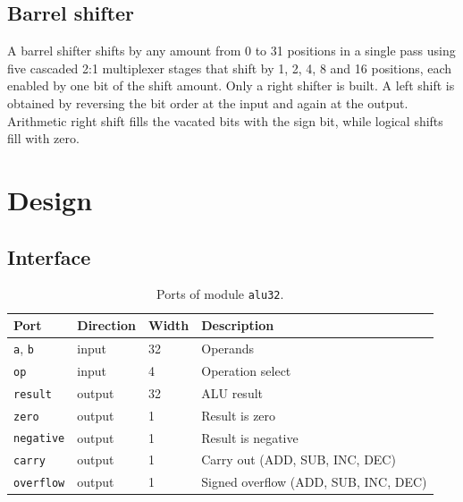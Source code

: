 \documentclass[11pt,a4paper]{article}
\begin{document}
\subsection{Barrel shifter}
A barrel shifter shifts by any amount from 0 to 31 positions in a single pass using five cascaded 2:1 multiplexer stages that shift by 1, 2, 4, 8 and 16 positions, each enabled by one bit of the shift amount. Only a right shifter is built. A left shift is obtained by reversing the bit order at the input and again at the output. Arithmetic right shift fills the vacated bits with the sign bit, while logical shifts fill with zero.

\section{Design}
\subsection{Interface}
\begin{table}[H]\centering
\begin{tabular}{@{}llll@{}}\toprule
Port & Direction & Width & Description\\\midrule
\texttt{a}, \texttt{b} & input & 32 & Operands\\
\texttt{op} & input & 4 & Operation select\\
\texttt{result} & output & 32 & ALU result\\
\texttt{zero} & output & 1 & Result is zero\\
\texttt{negative} & output & 1 & Result is negative\\
\texttt{carry} & output & 1 & Carry out (ADD, SUB, INC, DEC)\\
\texttt{overflow} & output & 1 & Signed overflow (ADD, SUB, INC, DEC)\\\bottomrule
\end{tabular}
\caption{Ports of module \texttt{alu32}.}
\end{table}
\end{document}
